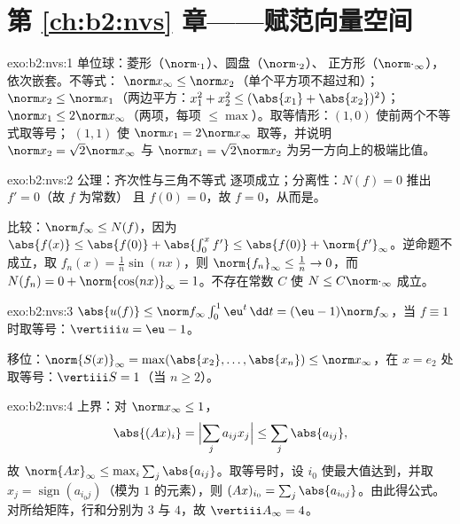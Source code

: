 \section*{第 \ref{ch:b2:nvs} 章——赋范向量空间}

\begin{solution}{exo:b2:nvs:1}
单位球：菱形（$\norm\cdot_1$）、圆盘（$\norm\cdot_2$）、
正方形（$\norm\cdot_\infty$），依次嵌套。不等式：
$\norm x_\infty \leq \norm x_2$（单个平方项不超过和）；
$\norm x_2 \leq \norm x_1$（两边平方：$x_1^2 + x_2^2 \leq (\abs{x_1}
+ \abs{x_2})^2$）；$\norm x_1 \leq 2\norm x_\infty$（两项，每项
$\leq \max$）。取等情形：$(1, 0)$ 使前两个不等式取等号；
$(1, 1)$ 使 $\norm x_1 = 2\norm x_\infty$ 取等，并说明
$\norm x_2 = \sqrt2 \norm x_\infty$ 与 $\norm x_1 = \sqrt2 \norm
x_2$ 为另一方向上的极端比值。
\end{solution}

\begin{solution}{exo:b2:nvs:2}
公理：齐次性与三角不等式
逐项成立；分离性：$N(f) = 0$ 推出 $f' = 0$（故 $f$ 为常数）
且 $f(0) = 0$，故 $f = 0$，从而是。

比较：$\norm f_\infty \leq N(f)$，因为 $\abs{f(x)} \leq
\abs{f(0)} + \abs{\int_0^x f'} \leq \abs{f(0)} +
\norm{f'}_\infty$。逆命题不成立，取 $f_n(x) = \frac1n
\sin(nx)$，则 $\norm{f_n}_\infty \leq \frac1n \to 0$，而
$N(f_n) = 0 + \norm{\cos(nx)}_\infty = 1$。不存在常数 $C$ 使
$N \leq C\norm\cdot_\infty$ 成立。
\end{solution}

\begin{solution}{exo:b2:nvs:3}
$\abs{u(f)} \leq \norm f_\infty \int_0^1 \eu^t\,\dd t = (\eu -
1)\norm f_\infty$，当 $f \equiv 1$ 时取等号：$\vertiii u =
\eu - 1$。

移位：$\norm{S(x)}_\infty = \max(\abs{x_2}, \dots, \abs{x_n}) \leq
\norm x_\infty$，在 $x = e_2$ 处取等号：$\vertiii S = 1$（当 $n
\geq 2$）。
\end{solution}

\begin{solution}{exo:b2:nvs:4}
上界：对 $\norm x_\infty \leq 1$，
\[
\abs{(Ax)_i} = \Bigl|\sum_j a_{ij}x_j\Bigr| \leq \sum_j
\abs{a_{ij}},
\]
故 $\norm{Ax}_\infty \leq \max_i \sum_j \abs{a_{ij}}$。取等号时，设
$i_0$ 使最大值达到，并取 $x_j = \operatorname{sign}(a_{i_0
j})$（模为 $1$ 的元素），则 $(Ax)_{i_0} = \sum_j \abs{a_{i_0
j}}$。由此得公式。对所给矩阵，行和分别为 $3$ 与
$4$，故 $\vertiii A_\infty = 4$。
\end{solution}

